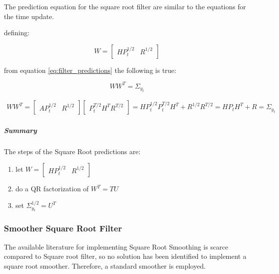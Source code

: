 \documentclass{article}
\begin{document}
The prediction equation for the square root filter are similar to the equations for the time update.

defining:

\begin{equation}
    W = \begin{bmatrix}HP_{t}^{1/2} & R^{1/2}\end{bmatrix}
\end{equation}

from equation \ref{eq:filter_predictions} the following is true:

\begin{equation}\label{predict_SR_mult}
WW^T = \Sigma_{y_t} 
\end{equation}

\begin{multline}
  WW^T =  \begin{bmatrix}AP_{t}^{1/2} & R^{1/2}\end{bmatrix}\begin{bmatrix}P_{t}^{T/2}H^T R^{T/2}\end{bmatrix}
  = HP_{t}^{1/2}P_{t}^{T/2}H^T + R^{1/2}R^{T/2} = HP_{t}H^T + R = \Sigma_{y_t}
\end{multline}

\subparagraph{Summary} The steps of the Square Root predictions are:

\begin{enumerate}
    \item let  $W = \begin{bmatrix}HP_t^{1/2} & R^{1/2}\end{bmatrix}$
    \item do a QR factorization of $W^T=TU$
    \item set $\Sigma_{y_t}^{1/2} = U^T$
\end{enumerate}

\subsubsection{Smoother Square Root Filter}

The available literature for implementing Square Root Smoothing is scarce compared to Square root filter, so no solution has been identified to implement a square root smoother. Therefore, a standard smoother is employed.
\end{document}

